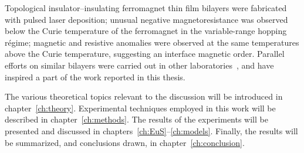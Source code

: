 Topological insulator--insulating ferromagnet thin film bilayers were fabricated with pulsed laser deposition; unusual negative magnetoresistance was observed below the Curie temperature of the ferromagnet in the variable-range hopping r\'egime; magnetic and resistive anomalies were observed at the same temperatures above the Curie temperature, suggesting an interface magnetic order. Parallel efforts on similar bilayers were carried out in other laboratories~\cite{Moodera2013, Samarth2013, Moodera2016}, and have inspired a part of the work reported in this thesis.

The various theoretical topics relevant to the discussion will be introduced in chapter~\ref{ch:theory}. Experimental techniques employed in this work will be described in chapter~\ref{ch:methods}. The results of the experiments will be presented and discussed in chapters~\ref{ch:EuS}--\ref{ch:models}. Finally, the results will be summarized, and conclusions drawn, in chapter~\ref{ch:conclusion}.